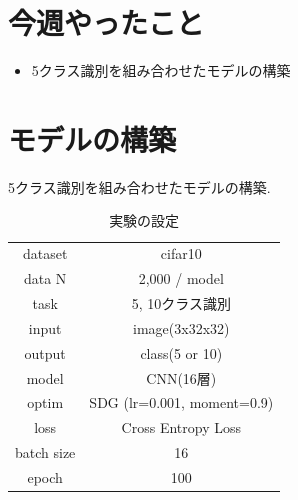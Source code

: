\documentclass[twocolumn]{jarticle}     %
\begin{document}


\section{今週やったこと}
\begin{itemize}
	\item {5クラス識別を組み合わせたモデルの構築}
\end{itemize}


\section{モデルの構築}
5クラス識別を組み合わせたモデルの構築.

\begin{table}[tb]
  \begin{center}
    \caption{実験の設定}
    \begin{tabular}{|c|c|} \hline
      dataset & cifar10 \\
      data N & 2,000 / model \\ \hline
      task & 5, 10クラス識別 \\
      input & image(3x32x32) \\
      output & class(5 or 10) \\ \hline
      model & CNN(16層) \\
      optim & SDG (lr=0.001, moment=0.9) \\
      loss & Cross Entropy Loss \\ \hline
      batch size & 16 \\
      epoch & 100 \\ \hline
    \end{tabular}
    \label{tab:setting}
  \end{center}
\end{table}
\end{document}

